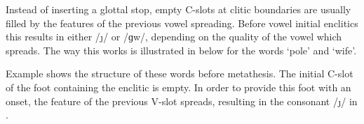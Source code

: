 Instead of inserting a glottal stop,
empty C-slots at clitic boundaries
are usually filled by the features of the previous vowel spreading.
Before vowel initial enclitics this results in either /\j/ or /ɡw/,
depending on the quality of the vowel which spreads.
The way this works is illustrated in  below for
the words  {\ra}  `pole' and  {\ra}  `wife'.

Example  shows the structure of these words before metathesis.
The initial C-slot of the foot containing the enclitic is empty.
In order to provide this foot with an onset, the feature \tsc{[+front]} of the previous
V-slot spreads, resulting in the consonant /\j/ in .

